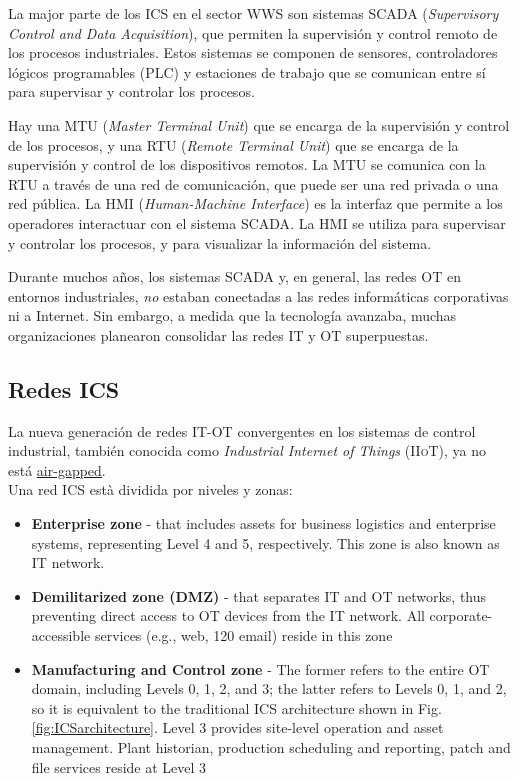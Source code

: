 La major parte de los \textsc{ICS} en el sector \textsc{WWS} son sistemas \textsc{SCADA} (\textit{Supervisory Control and Data Acquisition}), que permiten la supervisión y control remoto de los procesos industriales. Estos sistemas se componen de sensores, controladores lógicos programables (\textsc{PLC}) y estaciones de trabajo que se comunican entre sí para supervisar y controlar los procesos.

Hay una \textsc{MTU} (\textit{Master Terminal Unit}) que se encarga de la supervisión y control de los procesos, y una \textsc{RTU} (\textit{Remote Terminal Unit}) que se encarga de la supervisión y control de los dispositivos remotos. La \textsc{MTU} se comunica con la \textsc{RTU} a través de una red de comunicación, que puede ser una red privada o una red pública.
La \textsc{HMI} (\textit{Human-Machine Interface}) es la interfaz que permite a los operadores interactuar con el sistema \textsc{SCADA}. La \textsc{HMI} se utiliza para supervisar y controlar los procesos, y para visualizar la información del sistema.

Durante muchos años, los sistemas \textsc{SCADA} y, en general, las redes \textsc{OT} en entornos industriales, \textit{no} estaban conectadas a las redes informáticas corporativas ni a Internet. Sin embargo, a medida que la tecnología avanzaba, muchas organizaciones planearon consolidar las redes \textsc{IT} y \textsc{OT} superpuestas.

\subsection{Redes ICS}

La nueva generación de redes \textsc{IT-OT} convergentes en los sistemas de control industrial, también conocida como \textit{Industrial Internet of Things} (\textsc{IIoT}), ya no está \ul{air-gapped}.\\
Una red ICS està dividida por niveles y zonas:
\begin{itemize}
   \item \textbf{Enterprise zone }- that includes assets for business logistics and enterprise systems, representing Level 4 and 5, respectively. This zone is also known as \textsc{IT} network.
   \item \textbf{Demilitarized zone (DMZ) }- that separates \textsc{IT} and \textsc{OT} networks, thus preventing direct access to \textsc{OT} devices from the \textsc{IT} network. All corporate-accessible services (e.g., web, 120 email) reside in this zone
   \item \textbf{Manufacturing and Control zone }- The former refers to the entire OT domain, including Levels 0, 1, 2, and 3; the latter refers to Levels 0, 1, and 2, so it is equivalent to the traditional \textsc{ICS} architecture shown in Fig. \ref{fig:ICSarchitecture}. Level 3 provides site-level operation and asset management. Plant historian, production scheduling and reporting, patch and file services reside at Level 3 
\end{itemize}

